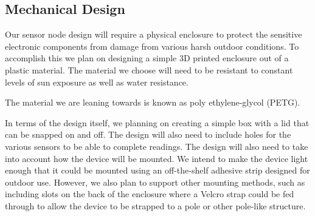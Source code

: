 \subsection{Mechanical Design}
Our sensor node design will require a physical enclosure to protect the sensitive electronic components from damage from various harsh outdoor conditions. To accomplish this we plan on designing a simple 3D printed enclosure out of a plastic material. The material we choose will need to be resistant to constant levels of sun exposure as well as water resistance.

The material we are leaning towards is known as poly ethylene-glycol (PETG).

In terms of the design itself, we planning on creating a simple box with a lid that can be snapped on and off. The design will also need to include holes for the various sensors to be able to complete readings. The design will also need to take into account how the device will be mounted. We intend to make the device light enough that it could be mounted using an off-the-shelf adhesive strip designed for outdoor use. However, we also plan to support other mounting methods, such as including slots on the back of the enclosure where a Velcro strap could be fed through to allow the device to be strapped to a pole or other pole-like structure.